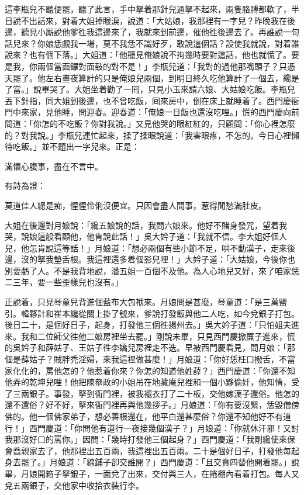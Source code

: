 這李瓶兒不聽便罷，聽了此言，手中拏着那針兒通拏不起來，兩隻胳膊都軟了，半日說不出話來，對着大姐掉眼淚，說道：「大姑娘，我那裡有一字兒？昨晚我在後邊，聽見小厮說他爹徃我這邊來了，我就來到前邊，催他徃後邊去了。再誰說一句話兒來？你娘恁覷我一場，莫不我恁不識好歹，敢說這個話？設使我就說，對着誰說來？也有個下落。」大姐道：「他聽見俺娘說不拘幾時要對這話，他也就慌了。要是我，你兩個當面鑼對面鼓的對不是！」李瓶兒道：「我對的過他那嘴頭子？只憑天罷了。他左右晝夜算計的只是俺娘兒兩個，到明日終久吃他算計了一個去，纔是了當。」{}說畢哭了。大姐坐着勸了一囘，只見小玉來請六娘、大姑娘吃飯。李瓶兒丟下針指，同大姐到後邊，也不曾吃飯，囘來房中，倒在床上就睡着了。西門慶衙門中來家，見他睡，問迎春。迎春道：「俺娘一日飯也還沒吃哩。」慌的西門慶向前問道：「你怎的不吃飯？你對我說。」又見他哭的眼紅紅的，只顧問：「你心裡怎麼的？對我說。」李瓶兒連忙起來，揉了揉眼說道：「我害眼疼，不怎的。今日心裡懶待吃飯。」並不題出一字兒來。正是：

滿懷心腹事，盡在不言中。

有詩為證：

莫道佳人總是痴，惺惺伶俐沒便宜。只因會盡人間事，惹得閒愁滿肚皮。

大姐在後邊對月娘說：「纔五娘說的話，我問六娘來。他好不賭身發咒，望着我哭，說娘這般看顧他，他肯說此話！」吳大妗子道：「我就不信。李大姐好個人兒，他怎肯說這等話！」月娘道：「想必兩個有些小節不足，哄不動漢子，走來後邊，沒的拏我墊舌根。我這裡還多着個影兒哩！」{}大妗子道：「大姑娘，今後你也別要虧了人。不是我背地說，潘五姐一百個不及他。為人心地兒又好，來了咱家恁二三年，要一些歪樣兒也沒有。」

正說着，只見琴童兒背進個藍布大包袱來。月娘問是甚麼，琴童道：「是三萬鹽引。韓夥計和崔本纔從關上掛了號來，爹說打發飯與他二人吃，如今兌銀子打包。後日二十，是個好日子，起身，打發他三個徃揚州去。」吳大妗子道：「只怕姐夫進來。我和二位師父徃他二娘房裡坐去罷。」剛說未畢，只見西門慶掀簾子進來，慌的吳妗子和薛姑子、王姑子徃李嬌兒房裡走不迭。早被西門慶看見，問月娘：「那個是薛姑子？賊胖禿淫婦，來我這裡做甚麼！」月娘道：「你好恁枉口撥舌，不當家化化的，罵他怎的？他惹着你來？你怎的知道他姓薛？」西門慶道：「你還不知他弄的乾坤兒哩！他把陳叅政的小姐吊在地藏庵兒裡和一個小夥偷奸，他知情，受了三兩銀子。事發，拏到衙門裡，被我褪衣打了二十板，交他嫁漢子還俗。他怎的還不還俗？好不好，拏來衙門裡再與他幾拶子。」月娘道：「你有要沒緊，恁毀僧傍佛的。他一個佛家弟子，想必善根還在，他平白還甚麼俗？你還不知他好不有道行！」{}西門慶道：「你問他有道行一夜接幾個漢子？」月娘道：「你就休汗邪！又討我那沒好口的罵你。」{}因問：「幾時打發他三個起身？」西門慶道：「我剛纔使來保會喬親家去了，他那裡出五百兩，我這裡出五百兩。二十是個好日子，打發他每起身去罷了。」月娘道：「線鋪子卻交誰開？」西門慶道：「且交賁四替他開着罷。」說畢，月娘開箱子拏銀子，一面兌了出來，交付與三人，在捲棚內看着打包。每人又兌五兩銀子，交他家中收拾衣裝行李。

